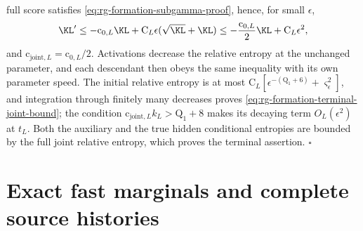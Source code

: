 full score satisfies \cref{eq:rg-formation-subgamma-proof}, hence, for small
\(\epsilon\),
\begin{equation}
 \KL'\le-\mathrm c_{0,L}\KL+
       \mathrm C_L\epsilon(\sqrt{\KL}+\KL)
 \le-\frac{\mathrm c_{0,L}}{2}\KL+\mathrm C_L\epsilon^2,
 \label{eq:rg-formation-joint-moving-reference}
\end{equation}
and \(\mathrm c_{\mathrm{joint},L}=\mathrm c_{0,L}/2\). Activations decrease the
relative entropy at the unchanged parameter, and each descendant then obeys
the same inequality with its own parameter speed. The initial relative entropy
is at most \(\mathrm C_L[\epsilon^{-(\mathrm Q_1+6)}+\varsigma_\epsilon^2]\), and
integration through finitely many decreases proves
\cref{eq:rg-formation-terminal-joint-bound}; the condition
\(\mathrm c_{\mathrm{joint},L}k_L>\mathrm Q_1+8\) makes its decaying term
\(O_L(\epsilon^2)\) at \(t_L\). Both the auxiliary and the true hidden
conditional entropies are bounded by the full joint relative entropy, which
proves the terminal assertion. \hfill\(\square\)

\section{Exact fast marginals and complete source histories}
\label{sec:rg-formation-history-proof}

